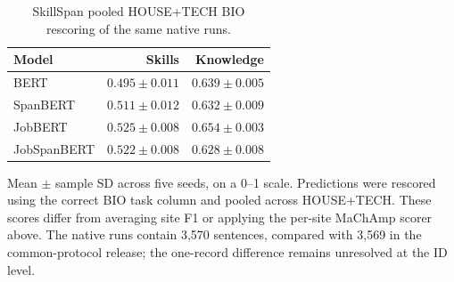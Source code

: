 \begin{table}[H]
\centering\small
\caption{SkillSpan pooled HOUSE+TECH BIO rescoring of the same native runs.}
\label{tab:external-native-pooled}
\begin{tabularx}{\linewidth}{@{}Lrr@{}}
\toprule
Model & Skills & Knowledge \\
\midrule
BERT & $0.495\pm0.011$ & $0.639\pm0.005$ \\
SpanBERT & $0.511\pm0.012$ & $0.632\pm0.009$ \\
JobBERT & $0.525\pm0.008$ & $0.654\pm0.003$ \\
JobSpanBERT & $0.522\pm0.008$ & $0.628\pm0.008$ \\
\bottomrule
\end{tabularx}
\par\smallskip\RaggedRight\footnotesize Mean $\pm$ sample SD across five seeds, on a 0--1 scale. Predictions were rescored using the correct BIO task column and pooled across HOUSE+TECH. These scores differ from averaging site F1 or applying the per-site MaChAmp scorer above. The native runs contain 3,570 sentences, compared with 3,569 in the common-protocol release; the one-record difference remains unresolved at the ID level.
\end{table}
